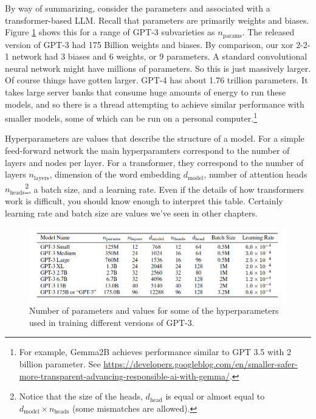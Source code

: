 By way of summarizing, consider the parameters and   associated with a transformer-based LLM. Recall that parameters are primarily weights and biases. Figure \ref{gptParams} shows this for a range of GPT-3 subvarieties as $n_\text{params}$. The released version of GPT-3 had 175 Billion weights and biases. By comparison, our xor 2-2-1 network had 3 biases and 6 weights, or 9 parameters. A standard convolutional neural network might have millions of parameters. So this is just massively larger. Of course things have gotten larger. GPT-4 has about 1.76 trillion parameters. It takes large server banks that  consume huge amounts of energy to run these models, and so there is a thread attempting to achieve similar performance with smaller models, some of which can be run on a  personal computer.\footnote{For example, Gemma2B achieves performance similar to GPT 3.5 with 2 billion parameter. See \url{https://developers.googleblog.com/en/smaller-safer-more-transparent-advancing-responsible-ai-with-gemma/}.}

Hyperparameters are values that describe the structure of a model. For a simple feed-forward network the main hyperparamters correspond to the number of layers and nodes per layer. For a transformer, they correspond to the number of layers $n_\text{layers}$, dimension of the word embedding $d_\text{model}$, number of attention heads $n_\text{heads}$\footnote{Notice that the size of the heads, $d_\text{head}$ is equal or almost equal to  $d_\text{model} \times n_\text{heads}$ (some mismatches are allowed).}, a batch size, and a learning rate. Even if the details of how transformers work is difficult, you should know enough to interpret this table. Certainly learning rate and batch size are values we've seen in other chapters.

\begin{figure}[h]
\centering
\includegraphics[scale=.4]{./images/gpt3_params.png}
\caption[\url{https://arxiv.org/abs/2005.14165}.]{Number of parameters and values for some of the hyperparameters used in training different versions of GPT-3. }
\label{gptParams}
\end{figure}

